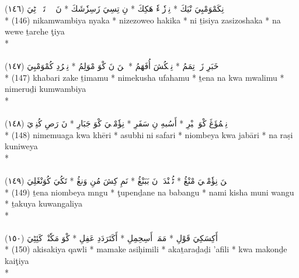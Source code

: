 \documentclass[a4paper, 12pt]{report}
\begin{document}
\begin{center}
\textarabic{(١٤٦) \textcolor{mygreen}{نِكَمْوَمْبِيَ نْيَكَ  * نِزٖزٗوٖءٗ هَكِكَ  * نِ تِسِيَ زَسِزٗشَكَ  * نَ وٖوٖ تَرٖهٖ ٹِيَ }} \\* 
(146) nikamwambiya nyaka  * nizezoweo hakika  * ni ṯisiya zasizoshaka  * na wewe ṯarehe ţiya  \\* 
 \\ 
\\[8mm] 

\textarabic{(١٤٧) \textcolor{mygreen}{خَبَرِ زَكٖ تِمَمُ  * نِمٖكُشَ أُفَهَمُ  * تٖنَ نَ كْوَ مْوَلِمُ  * نِمٖرُدِ كُمْوَمْبِيَ }} \\* 
(147) khabari zake ṯimamu  * nimekusha ufahamu  * ṯena na kwa mwalimu  * nimeruḏi kumwambiya  \\* 
 \\ 
\\[8mm] 

\textarabic{(١٤٨) \textcolor{mygreen}{نِمٖمُؤَڠَ كْوَ خٖيْرِ  * أَسُبهِ نِ سَفَرِ  * نِؤٗمْبٖيَ كْوَ جَبَارِ  * نَ رَصِ كُنِوٖيَ }} \\* 
(148) nimemuaga kwa khēri  * asubhi ni safari  * niombeya kwa jabāri  * na raṣi kuniweya  \\* 
 \\ 
\\[8mm] 

\textarabic{(١٤٩) \textcolor{mygreen}{تٖنَ نِؤٗمْبٖيَ مْنْڠُ  * ٹُپٖنْدَنٖ نَ بَبَنْڠُ  * نَمِ كِشَ مُنِ وَنڠُ  * تَكُيَ كُوَنْڠَلِيَ }} \\* 
(149) ṯena niombeya mngu  * ţupenḏane na babangu  * nami kisha muni wangu  * ṯakuya kuwangaliya  \\* 
 \\ 
\\[8mm] 

\textarabic{(١٥٠) \textcolor{mygreen}{أَكِسَكِيَ قَوْلِ  * مَمَكٖ أَسِحِمِلِ  * أَكَتَرَدَدِ عَفِلِ  * كْوَ مَكٗنْدٖ كَئِٹِيَ }} \\* 
(150) akisakiya qawli  * mamake asiḥimili  * akaṯaraḏaḏi 'afili  * kwa makonḏe kaiţiya  \\* 
 \\ 
\\[8mm] 


\end{center}
\end{document}
